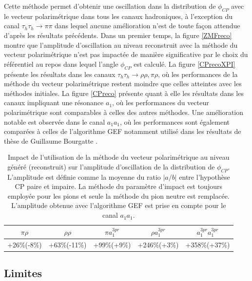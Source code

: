 Cette méthode permet d'obtenir une oscillation dans la distribution de $\phi_{CP}$ avec le vecteur polarimétrique dans tous les canaux hadroniques, à l'exception du canal $\tau_h\tau_h\rightarrow\pi\pi$ dans lequel aucune amélioration n'est de toute façon attendue d'après les résultats précédents. Dans un premier temps, la figure \ref{ZMFreco} montre que l'amplitude d'oscillation au niveau reconstruit avec la méthode du vecteur polarimétrique n'est pas impactée de manière significative par le choix du référentiel au repos dans lequel l'angle $\phi_{CP}$ est calculé. La figure \ref{CPrecoXPI} présente les résultats dans les canaux $\tau_h\tau_h\rightarrow\rho\rho,\pi\rho$, où les performances de la méthode du vecteur polarimétrique restent moindre que celles atteintes avec les méthodes initiales. La figure \ref{CPreco} présente quant à elle les résultats dans les canaux impliquant une résonance $a_1$, où les performances du vecteur polarimétrique sont comparables à celles des autres méthodes. Une amélioration notable est observée dans le canal $a_1a_1$, où les performances sont également comparées à celles de l'algorithme GEF notamment utilisé dans les résultats de thèse de Guillaume Bourgatte \cite{guigui}. \\

\begin{table}[]
\centering
\begin{tabular}{@{}ccccc@{}}
\toprule
$\pi\rho$   & $\rho\rho$   & $\pi a_1^{3pr}$ & $\rho a_1^{3pr}$ & $a_1^{3pr} a_1^{3pr}$ \\ \midrule
+26\%(-8\%) & +63\%(-11\%) & +99\%(+9\%)     & +246\%(+3\%)     & +358\%(+37\%)         \\ \bottomrule
\end{tabular}
\caption{Impact de l'utilisation de la méthode du vecteur polarimétrique au niveau généré (reconstruit) sur l'amplitude d'oscillation de la distribution de $\phi_{CP}$. L'amplitude est définie comme la moyenne du ratio $|a/b|$ entre l'hypothèse CP paire et impaire. La méthode du paramètre d'impact est toujours employée pour les pions et seule la méthode du pion neutre est remplacée. L'amplitude obtenue avec l'algorithme GEF est prise en compte pour le canal $a_1 a_1$.}
\label{recapAmp}
\end{table}

\subsection{Limites}

